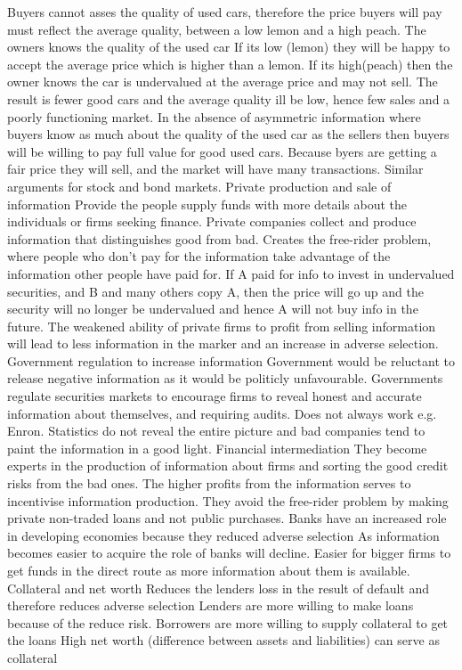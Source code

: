 \documentclass[12pt]{examnotes}
\begin{document}
\ra Buyers cannot asses the quality of used cars, therefore the price buyers will pay must reflect the average quality, between a low lemon and a high peach.
\ra The owners knows the quality of the used car
 If its low (lemon) they will be happy to accept the average price which is higher than a lemon. 
 If its high(peach) then the owner knows the car is undervalued at the average price and may not sell. 
\ra The result is fewer good cars and the average quality ill be low, hence few sales and a poorly functioning market.
\ra In the absence of asymmetric information where buyers know as much about the quality of the used car as the sellers then buyers will be willing to pay full value for good used cars.
\ra Because byers are getting a fair price they will sell, and the market will have many transactions.
\ra Similar arguments for stock and bond markets.
\vspace{6pt}
 Private production and sale of information
\rna Provide the people supply funds with more details  about the individuals or firms seeking finance.
\rna Private companies collect and produce information that distinguishes good from bad.
\rna Creates the free-rider problem, where people who don't pay for the information take advantage of the information other people have paid for.
\rna If A paid for info to invest in undervalued securities, and B and many others copy A, then the price will go up and the security will no longer be undervalued and hence A will not buy info in the future.
\rna The weakened ability of private firms to profit from selling information will lead to less information in the marker and an increase in adverse selection.
 Government regulation to increase information
\rna Government would be reluctant to release negative information as it would be politicly unfavourable.
\rna Governments regulate securities markets to encourage firms to reveal honest and accurate information about themselves, and requiring audits. 
\rna Does not always work e.g. Enron. Statistics do not reveal the entire picture and bad companies tend to paint the information in a good light.
 Financial intermediation
\rna They become experts in the production of information about firms and sorting the good credit risks from the bad ones.
\rna The higher profits from the information serves to incentivise information production.
\rna They avoid the free-rider problem by making private non-traded loans and not public purchases.
\rna Banks have an increased role in developing economies because they reduced adverse selection
\rna As information becomes easier to acquire the role of banks will decline.
\rna Easier for bigger firms to get funds in the direct route as more information about them is available.
 Collateral and net worth
\rna Reduces the lenders loss in the result of default and therefore reduces adverse selection
\rna Lenders are more willing to make loans because of the reduce risk.
\rna Borrowers are more willing to supply collateral to get the loans
\rna High net worth (difference between assets and liabilities) can serve as collateral
\end{document}

